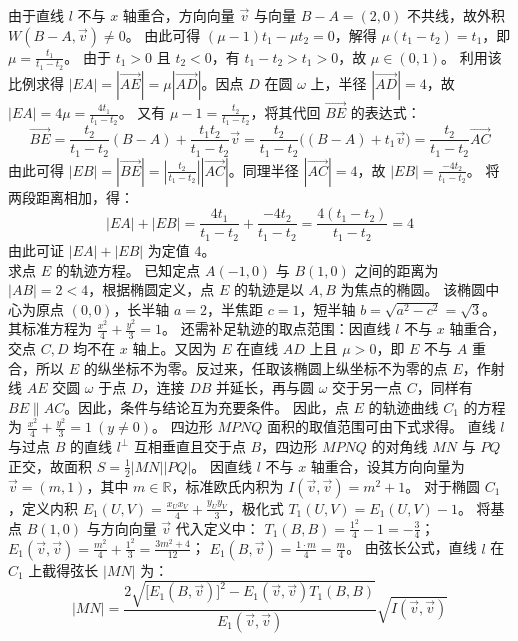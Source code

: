 \begin{solution}
由于直线 $l$ 不与 $x$ 轴重合，方向向量 $\vec{v}$ 与向量 $B - A = (2,0)$ 不共线，故外积 $W(B - A, \vec{v}) \neq 0$。
由此可得 $(\mu - 1)t_1 - \mu t_2 = 0$，解得 $\mu(t_1 - t_2) = t_1$，即 $\mu = \frac{t_1}{t_1 - t_2}$。
由于 $t_1 > 0$ 且 $t_2 < 0$，有 $t_1 - t_2 > t_1 > 0$，故 $\mu \in (0, 1)$。
利用该比例求得 $|EA| = |\overrightarrow{AE}| = \mu |\overrightarrow{AD}|$。因点 $D$ 在圆 \(\omega\) 上，半径 $|\overrightarrow{AD}| = 4$，故 $|EA| = 4\mu = \frac{4t_1}{t_1 - t_2}$。
又有 $\mu - 1 = \frac{t_2}{t_1 - t_2}$，将其代回 $\overrightarrow{BE}$ 的表达式：
$$ \overrightarrow{BE} = \frac{t_2}{t_1 - t_2}(B - A) + \frac{t_1 t_2}{t_1 - t_2}\vec{v} = \frac{t_2}{t_1 - t_2} \big( (B - A) + t_1\vec{v} \big) = \frac{t_2}{t_1 - t_2} \overrightarrow{AC} $$
由此可得 $|EB| = |\overrightarrow{BE}| = \left| \frac{t_2}{t_1 - t_2} \right| |\overrightarrow{AC}|$。同理半径 $|\overrightarrow{AC}| = 4$，故 $|EB| = \frac{-4t_2}{t_1 - t_2}$。
将两段距离相加，得：
$$ |EA| + |EB| = \frac{4t_1}{t_1 - t_2} + \frac{-4t_2}{t_1 - t_2} = \frac{4(t_1 - t_2)}{t_1 - t_2} = 4 $$
由此可证 $|EA| + |EB|$ 为定值 $4$。\\
求点 $E$ 的轨迹方程。
已知定点 $A(-1,0)$ 与 $B(1,0)$ 之间的距离为 $|AB| = 2 < 4$，根据椭圆定义，点 $E$ 的轨迹是以 $A, B$ 为焦点的椭圆。
该椭圆中心为原点 $(0,0)$，长半轴 $a = 2$，半焦距 $c = 1$，短半轴 $b = \sqrt{a^2 - c^2} = \sqrt{3}$。
其标准方程为 $\frac{x^2}{4} + \frac{y^2}{3} = 1$。
还需补足轨迹的取点范围：因直线 $l$ 不与 $x$ 轴重合，交点 $C,D$ 均不在 $x$ 轴上。又因为 $E$ 在直线 $AD$ 上且 $\mu > 0$，即 $E$ 不与 $A$ 重合，所以 $E$ 的纵坐标不为零。反过来，任取该椭圆上纵坐标不为零的点 $E$，作射线 $AE$ 交圆 \(\omega\) 于点 $D$，连接 $DB$ 并延长，再与圆 \(\omega\) 交于另一点 $C$，同样有 $BE \parallel AC$。因此，条件与结论互为充要条件。
因此，点 $E$ 的轨迹曲线 $C_1$ 的方程为 $\frac{x^2}{4} + \frac{y^2}{3} = 1 \ (y \neq 0)$。
四边形 $MPNQ$ 面积的取值范围可由下式求得。
直线 $l$ 与过点 $B$ 的直线 $l^\perp$ 互相垂直且交于点 $B$，四边形 $MPNQ$ 的对角线 $MN$ 与 $PQ$ 正交，故面积 $S = \frac{1}{2} |MN| |PQ|$。
因直线 $l$ 不与 $x$ 轴重合，设其方向向量为 $\vec{v} = (m, 1)$，其中 $m \in \mathbb{R}$，标准欧氏内积为 $I(\vec{v}, \vec{v}) = m^2 + 1$。
对于椭圆 $C_1$，定义内积 $E_1(U, V) = \frac{x_U x_V}{4} + \frac{y_U y_V}{3}$，极化式 $T_1(U, V) = E_1(U, V) - 1$。
将基点 $B(1,0)$ 与方向向量 $\vec{v}$ 代入定义中：
$T_1(B, B) = \frac{1^2}{4} - 1 = -\frac{3}{4}$；
$E_1(\vec{v}, \vec{v}) = \frac{m^2}{4} + \frac{1^2}{3} = \frac{3m^2 + 4}{12}$；
$E_1(B, \vec{v}) = \frac{1 \cdot m}{4} = \frac{m}{4}$。
由弦长公式，直线 $l$ 在 $C_1$ 上截得弦长 $|MN|$ 为：
$$ |MN| = \frac{2\sqrt{\big[E_1(B, \vec{v})\big]^2 - E_1(\vec{v}, \vec{v})T_1(B, B)}}{E_1(\vec{v}, \vec{v})} \sqrt{I(\vec{v}, \vec{v})} $$

\end{solution}
